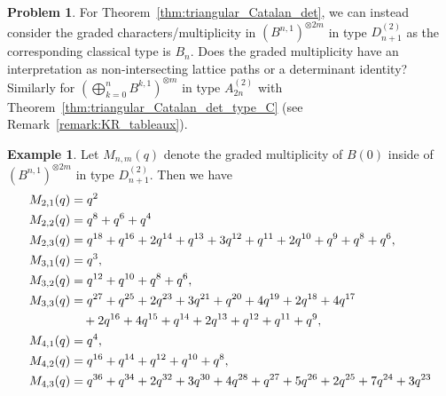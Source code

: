 \documentclass[11pt, leqno]{amsart}
\theoremstyle{plain}
\theoremstyle{definition}
\newtheorem{example}[theorem]{Example}
\newtheorem{problem}[theorem]{Problem}
\numberwithin{equation}{section}
\begin{document}
\begin{problem}
For Theorem~\ref{thm:triangular_Catalan_det}, we can instead consider the graded characters/multiplicity in $(B^{n,1})^{\otimes 2m}$ in type $D_{n+1}^{(2)}$ as the corresponding classical type is $B_n$. Does the graded multiplicity have an interpretation as non-intersecting lattice paths or a determinant identity?
Similarly for $(\bigoplus_{k=0}^n B^{k,1})^{\otimes m}$ in type $A_{2n}^{(2)}$ with Theorem~\ref{thm:triangular_Catalan_det_type_C} (see Remark~\ref{remark:KR_tableaux}).
\end{problem}

\begin{example}
Let $M_{n,m}(q)$ denote the graded multiplicity of $B(0)$ inside of $(B^{n,1})^{\otimes 2m}$ in type $D_{n+1}^{(2)}$. Then we have
\begin{align*}
M_{2,1}(q) & = q^2
\allowdisplaybreaks \\ M_{2,2}(q) & = q^8+q^6+q^4
\allowdisplaybreaks \\ M_{2,3}(q) & = q^{18} + q^{16} + 2 q^{14} + q^{13} + 3 q^{12} + q^{11} + 2 q^{10} + q^9 + q^8 + q^6,
\allowdisplaybreaks \\ M_{3,1}(q) & = q^{3},
\allowdisplaybreaks \\ M_{3,2}(q) & = q^{12} + q^{10} + q^{8} + q^{6},
\allowdisplaybreaks \\ M_{3,3}(q) & = q^{27} + q^{25} + 2 q^{23} + 3 q^{21} + q^{20} + 4 q^{19} + 2 q^{18} + 4 q^{17}
  \\ & \hspace{10pt} + 2 q^{16} + 4 q^{15} + q^{14} + 2 q^{13} + q^{12} + q^{11} + q^{9},
\allowdisplaybreaks \\ M_{4,1}(q) & = q^{4},
\allowdisplaybreaks \\ M_{4,2}(q) & = q^{16} + q^{14} + q^{12} + q^{10} + q^{8},
\allowdisplaybreaks \\ M_{4,3}(q) & = q^{36} + q^{34} + 2 q^{32} + 3 q^{30} + 4 q^{28} + q^{27} + 5 q^{26} + 2 q^{25} + 7 q^{24} + 3 q^{23}

\end{align*}
\end{example}
\end{document}
